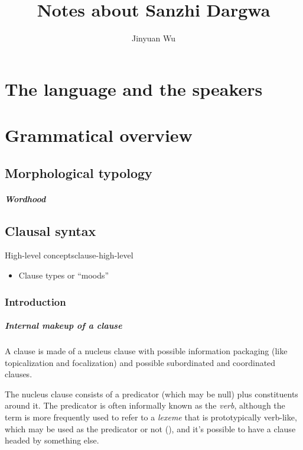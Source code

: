 \documentclass[a4paper, oneside, 12pt]{report}
\title{Notes about Sanzhi Dargwa}
\author{Jinyuan Wu}
\begin{document}
\maketitle

\chapter{The language and the speakers}

\chapter{Grammatical overview}

\section{Morphological typology}

\paragraph*{Wordhood}



\section{Clausal syntax}

\begin{todobox}{High-level concepts}{clause-high-level}
    \begin{itemize}
        \item Clause types or ``moods''
    \end{itemize}
\end{todobox}

\subsection{Introduction}

\paragraph*{Internal makeup of a clause}
A clause is made of a nucleus clause with possible information packaging
(like topicalization and focalization) 
and possible subordinated and coordinated clauses.

The nucleus clause consists of a predicator (which may be null) plus constituents around it.
The predicator is often informally known as the \emph{verb}, 
although the term is more frequently used to refer to 
a \emph{lexeme} that is prototypically verb-like, 
which may be used as the predicator or not (), 
and it's possible to have a clause headed by something else.
\end{document}
